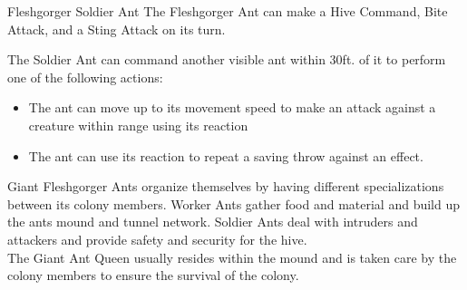 \begin{DndMonster}[width=0.5\textwidth]{Fleshgorger Soldier Ant}
	The Fleshgorger Ant can make a Hive Command, Bite Attack, and a Sting Attack on its turn.
	
	\DndMonsterAttack[
      name=Bite,
      distance=melee, %
      mod=+6,
      reach=5,
      targets=one target,
      dmg=\DndDice{2d6 + 6},
      dmg-type=piercing,
    ]
    
    \DndMonsterAttack[
      name=Sting,
      distance=melee, %
      mod=+6,
      reach=5,
      targets=one target,
      dmg=\DndDice{1d10 + 4},
      dmg-type=piercing,
      extra={. Creatures must succed a DC 13 Constitution Saving Throw or take \DndDice{2d6} poison damage. On a successful save, it takes half damage},
    ]
    
    The Soldier Ant can command another visible ant within 30ft. of it to perform one of the following actions:
    \begin{itemize}
    		\item The ant can move up to its movement speed to make an attack against a creature within range using its reaction
    		\item The ant can use its reaction to repeat a saving throw against an effect.
    \end{itemize}
      
\end{DndMonster}

\noindent Giant Fleshgorger Ants organize themselves by having different specializations between its colony members. Worker Ants gather food and material and build up the ants mound and tunnel network. Soldier Ants deal with intruders and attackers and provide safety and security for the hive.\\
The Giant Ant Queen usually resides within the mound and is taken care by the colony members to ensure the survival of the colony.

